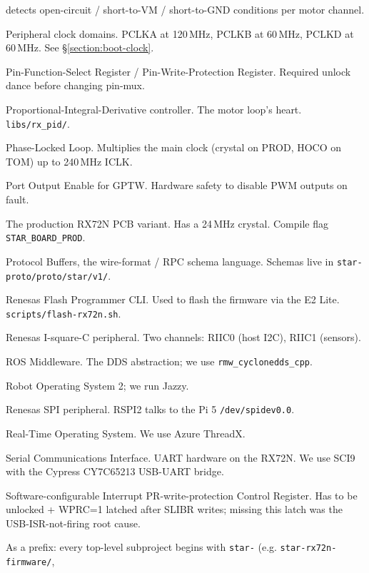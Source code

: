 \begin{description}
        detects open-circuit / short-to-VM / short-to-GND conditions
        per motor channel.
  \item[PCLKA / PCLKB / PCLKD] Peripheral clock domains. PCLKA at
        120\,MHz, PCLKB at 60\,MHz, PCLKD at 60\,MHz. See \S\ref{section:boot-clock}.
  \item[PFS / PWPR] Pin-Function-Select Register / Pin-Write-Protection
        Register. Required unlock dance before changing pin-mux.
  \item[PID] Proportional-Integral-Derivative controller. The motor
        loop's heart. \texttt{libs/rx\_pid/}.
  \item[PLL] Phase-Locked Loop. Multiplies the main clock (crystal
        on PROD, HOCO on TOM) up to 240\,MHz ICLK.
  \item[POEG] Port Output Enable for GPTW. Hardware safety to disable
        PWM outputs on fault.
  \item[PROD] The production RX72N PCB variant. Has a 24\,MHz
        crystal. Compile flag \texttt{STAR\_BOARD\_PROD}.
  \item[Protobuf] Protocol Buffers, the wire-format / RPC schema
        language. Schemas live in \texttt{star-proto/proto/star/v1/}.
  \item[RFP-CLI] Renesas Flash Programmer CLI. Used to flash the
        firmware via the E2 Lite. \texttt{scripts/flash-rx72n.sh}.
  \item[RIIC] Renesas I-square-C peripheral. Two channels: RIIC0
        (host I2C), RIIC1 (sensors).
  \item[RMW] ROS Middleware. The DDS abstraction; we use
        \texttt{rmw\_cyclonedds\_cpp}.
  \item[ROS2] Robot Operating System 2; we run Jazzy.
  \item[RSPI] Renesas SPI peripheral. RSPI2 talks to the Pi 5
        \texttt{/dev/spidev0.0}.
  \item[RTOS] Real-Time Operating System. We use Azure ThreadX.
  \item[SCI] Serial Communications Interface. UART hardware on the
        RX72N. We use SCI9 with the Cypress CY7C65213 USB-UART bridge.
  \item[SLIPRCR] Software-configurable Interrupt PR-write-protection
        Control Register. Has to be unlocked + WPRC=1 latched after
        SLIBR writes; missing this latch was the USB-ISR-not-firing
        root cause.
  \item[Star] As a prefix: every top-level subproject begins with
        \texttt{star-} (e.g. \texttt{star-rx72n-firmware/},

\end{description}
